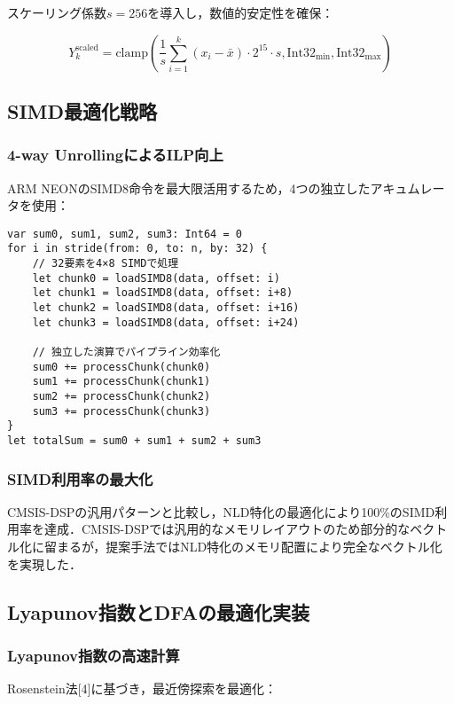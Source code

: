 \documentclass[10pt,twocolumn]{article}
\begin{document}
\begin{CJK}{UTF8}{min}
スケーリング係数$s=256$を導入し，数値的安定性を確保：

\begin{equation}
Y_k^{\text{scaled}} = \text{clamp}\left(\frac{1}{s} \sum_{i=1}^{k} (x_i - \bar{x}) \cdot 2^{15} \cdot s, \text{Int32}_{\min}, \text{Int32}_{\max}\right)
\end{equation}

\subsection{SIMD最適化戦略}

\subsubsection{4-way UnrollingによるILP向上}
ARM NEONのSIMD8命令を最大限活用するため，4つの独立したアキュムレータを使用：

\begin{lstlisting}[caption=4-way unrollingの実装]
var sum0, sum1, sum2, sum3: Int64 = 0
for i in stride(from: 0, to: n, by: 32) {
    // 32要素を4×8 SIMDで処理
    let chunk0 = loadSIMD8(data, offset: i)
    let chunk1 = loadSIMD8(data, offset: i+8)
    let chunk2 = loadSIMD8(data, offset: i+16)
    let chunk3 = loadSIMD8(data, offset: i+24)
    
    // 独立した演算でパイプライン効率化
    sum0 += processChunk(chunk0)
    sum1 += processChunk(chunk1)
    sum2 += processChunk(chunk2)
    sum3 += processChunk(chunk3)
}
let totalSum = sum0 + sum1 + sum2 + sum3
\end{lstlisting}

\subsubsection{SIMD利用率の最大化}
CMSIS-DSPの汎用パターンと比較し，NLD特化の最適化により100\%のSIMD利用率を達成．CMSIS-DSPでは汎用的なメモリレイアウトのため部分的なベクトル化に留まるが，提案手法ではNLD特化のメモリ配置により完全なベクトル化を実現した．

\subsection{Lyapunov指数とDFAの最適化実装}

\subsubsection{Lyapunov指数の高速計算}
Rosenstein法[4]に基づき，最近傍探索を最適化：


\end{CJK}
\end{document}
